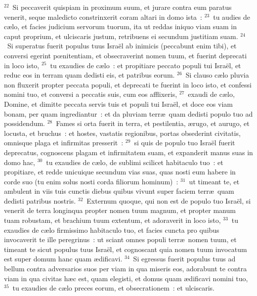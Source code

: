 ${}^{22}$~Si peccaverit quispiam in proximum suum, et jurare contra eum paratus venerit, seque maledicto constrinxerit coram altari in domo ista~:
${}^{23}$~tu audies de c\ae lo, et facies judicium servorum tuorum, ita ut reddas iniquo viam suam in caput proprium, et ulciscaris justum, retribuens ei secundum justitiam suam.
${}^{24}$~Si superatus fuerit populus tuus Isra\"el ab inimicis (peccabunt enim tibi), et conversi egerint pœnitentiam, et obsecraverint nomen tuum, et fuerint deprecati in loco isto,
${}^{25}$~tu exaudies de c\ae lo~: et propitiare peccato populi tui Isra\"el, et reduc eos in terram quam dedisti eis, et patribus eorum.
${}^{26}$~Si clauso c\ae lo pluvia non fluxerit propter peccata populi, et deprecati te fuerint in loco isto, et confessi nomini tuo, et conversi a peccatis suis, cum eos afflixeris,
${}^{27}$~exaudi de c\ae lo, Domine, et dimitte peccata servis tuis et populi tui Isra\"el, et doce eos viam bonam, per quam ingrediantur~: et da pluviam terr\ae\ quam dedisti populo tuo ad possidendum.
${}^{28}$~Fames si orta fuerit in terra, et pestilentia, \ae rugo, et aurugo, et locusta, et bruchus~: et hostes, vastatis regionibus, portas obsederint civitatis, omnisque plaga et infirmitas presserit~:
${}^{29}$~si quis de populo tuo Isra\"el fuerit deprecatus, cognoscens plagam et infirmitatem suam, et expanderit manus suas in domo hac,
${}^{30}$~tu exaudies de c\ae lo, de sublimi scilicet habitaculo tuo~: et propitiare, et redde unicuique secundum vias suas, quas nosti eum habere in corde suo (tu enim solus nosti corda filiorum hominum)~:
${}^{31}$~ut timeant te, et ambulent in viis tuis cunctis diebus quibus vivunt super faciem terr\ae\ quam dedisti patribus nostris.
${}^{32}$~Externum quoque, qui non est de populo tuo Isra\"el, si venerit de terra longinqua propter nomen tuum magnum, et propter manum tuam robustam, et brachium tuum extentum, et adoraverit in loco isto,
${}^{33}$~tu exaudies de c\ae lo firmissimo habitaculo tuo, et facies cuncta pro quibus invocaverit te ille peregrinus~: ut sciant omnes populi terr\ae\ nomen tuum, et timeant te sicut populus tuus Isra\"el, et cognoscant quia nomen tuum invocatum est super domum hanc quam \ae dificavi.
${}^{34}$~Si egressus fuerit populus tuus ad bellum contra adversarios suos per viam in qua miseris eos, adorabunt te contra viam in qua civitas h\ae c est, quam elegisti, et domus quam \ae dificavi nomini tuo,
${}^{35}$~tu exaudies de c\ae lo preces eorum, et obsecrationem~: et ulciscaris.


